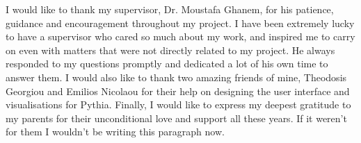 

\begin{acknowledgements}      %

I would like to thank my supervisor, Dr. Moustafa Ghanem, for his patience, guidance and encouragement
throughout my project. I have been extremely lucky to have a supervisor who cared so much about my work, 
and inspired me to carry on even with matters that were not directly related to my project. He always responded to 
my questions promptly and dedicated a lot of his own time to answer them. I would also like to thank
two amazing friends of mine, Theodosis Georgiou and Emilios Nicolaou for their help on designing the user 
interface and visualisations for Pythia. Finally, I would like to express my deepest gratitude to my parents for their
unconditional love and support all these years. If it weren't for them I wouldn't be writing this paragraph now. 
\end{acknowledgements}


